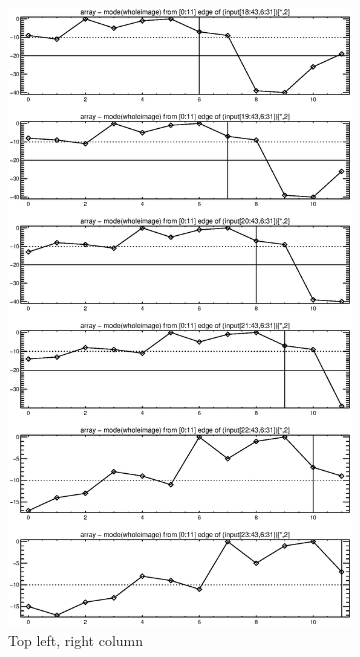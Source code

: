 \documentclass[10pt]{article}
\begin{document}
\begin{figure}[!h]
    \centering 
    \hspace{-1.0in}
    \begin{subfigure}[b]{.4\linewidth}
        \centering
        \includegraphics[width=1.4\textwidth]{plots_tables_images/topright0.eps} 
        \caption{Top left, right column}
    \end{subfigure}
    \hspace{1.0in}
    \begin{subfigure}[b]{.4\linewidth}

\end{subfigure}
\end{figure}
\end{document}
